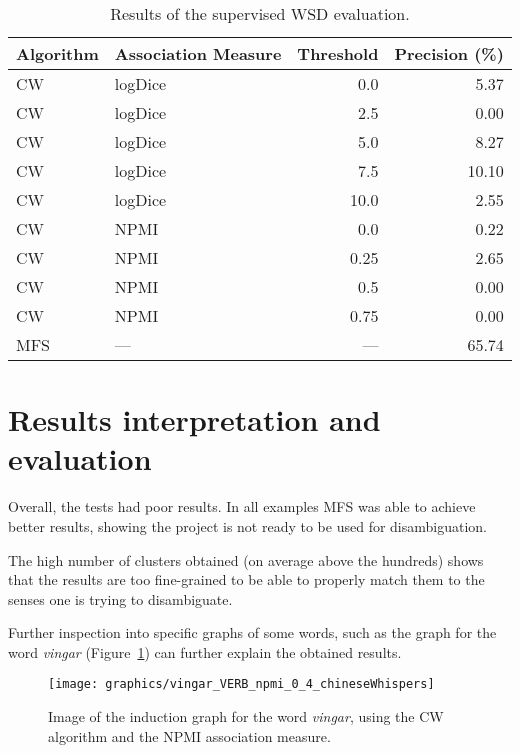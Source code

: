 \begin{table}[ht]
\caption{Results of the supervised \ac*{WSD} evaluation.}
\label{tab:sup-results}
\begin{tabu} to \textwidth {Xlrr}
\hline
\textbf{Algorithm} & \textbf{Association Measure} & \textbf{Threshold} & \textbf{Precision (\%)} \\
\hline
\ac{CW} & logDice   &  0.0 &  5.37 \\
\ac{CW} & logDice   &  2.5 &  0.00 \\
\ac{CW} & logDice   &  5.0 &  8.27 \\
\ac{CW} & logDice   &  7.5 & 10.10 \\
\ac{CW} & logDice   & 10.0 &  2.55 \\
\hline
\ac{CW} & \ac{NPMI} & 0.0  &  0.22 \\
\ac{CW} & \ac{NPMI} & 0.25 &  2.65 \\
\ac{CW} & \ac{NPMI} & 0.5  &  0.00 \\
\ac{CW} & \ac{NPMI} & 0.75 &  0.00 \\
\hline
\ac{MFS} & ---      &  --- & 65.74 \\
\hline
\end{tabu}
\end{table}

\section{Results interpretation and evaluation}

Overall, the tests had poor results. In all examples \ac{MFS} was able to
achieve better results, showing the project is not ready to be used for
disambiguation.

The high number of clusters obtained (on average above the hundreds) shows that
the results are too fine-grained to be able to properly match them to the 
senses one is trying to disambiguate.

Further inspection into specific graphs of some words, such as the graph for the
word \emph{vingar} (Figure~\ref{fig:vingar_graph}) can further explain the
obtained results.

\begin{figure}[ht]
  \caption{Image of the induction graph for the word \emph{vingar}, using the
    \ac*{CW} algorithm and the \ac*{NPMI} association measure.}
  \label{fig:vingar_graph}
  \centering
  \texttt{[image: graphics/vingar\_VERB\_npmi\_0\_4\_chineseWhispers]}
\end{figure}

